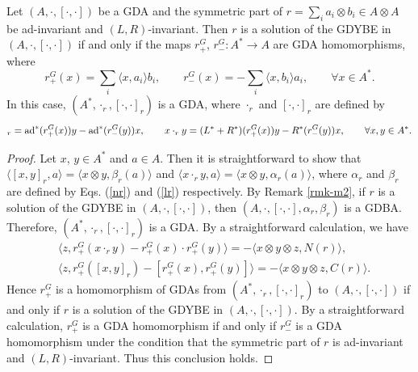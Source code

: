 \documentclass[12pt]{amsart}
\begin{document}
\begin{proposition}
    Let $(A,\cdot,[\cdot,\cdot])$ be a GDA and the symmetric part of $r=\sum_i a_i\otimes b_i \in A\otimes A$ be {\rm ad}-invariant and $(L,R)$-invariant. Then $r$ is a solution of the GDYBE in $(A,\cdot,[\cdot,\cdot])$ if and only if the maps
    $r^G_+$, $r^G_-:A^{*}\rightarrow A$ are GDA homomorphisms, where
    \begin{equation*}
        r^G_+(x)=\sum_i \langle x,a_i\rangle b_i,\qquad  r^G_-(x)=-\sum_i \langle x,b_i\rangle a_i,\qquad \forall x\in A^*.
    \end{equation*}
In this case,     $(A^{*},\cdot_r,[\cdot,\cdot]_r)$ is a GDA, where $\cdot_r$ and $[\cdot,\cdot]_r$ are defined by
    \begin{equation*}
        [x,y]_r={\rm ad}^*(r^G_+(x))y-{\rm ad}^*(r^G_-(y))x,\qquad x\cdot_r y=(L^*+R^*)(r^G_+(x))y-R^*(r^G_-(y))x,\qquad
        \forall x,y\in A^*.
    \end{equation*}
\end{proposition}
\begin{proof}
Let $x$, $y\in A^\ast$ and $a\in A$.   Then it is straightforward
to show that $\langle [x,y]_r, a\rangle =\langle x\otimes y,
\beta_r(a)\rangle$ and $\langle x\cdot_r y, a\rangle =\langle
x\otimes y, \alpha_r(a)\rangle$, where $\alpha_r$ and $\beta_r$
are defined by Eqs. (\ref{nr}) and (\ref{lr}) respectively. By
Remark \ref{rmk-m2}, if $r$ is a solution of the GDYBE in
$(A,\cdot,[\cdot,\cdot])$, then $(A, \cdot, [\cdot,\cdot],
\alpha_r, \beta_r)$ is a GDBA. Therefore,
$(A^{*},\cdot_r,[\cdot,\cdot]_r)$ is a GDA.
    By a straightforward calculation, we have
    \begin{align*}
        &\langle z,r^G_+(x\cdot_r y)-r^G_+(x)\cdot r^G_+(y)\rangle=-\langle x\otimes y\otimes z,N(r)\rangle,\\
        &\langle z,r^G_+([x,y]_r)-[r^G_+(x),r^G_+(y)]\rangle=-\langle x\otimes y\otimes
        z,C(r)\rangle.
    \end{align*}
Hence $r^G_+$ is a homomorphism of GDAs from $(A^*, \cdot_r,
[\cdot,\cdot]_r)$ to $(A, \cdot, [\cdot,\cdot])$ if and only if $r$ is a
solution of the GDYBE in $(A,\cdot,[\cdot,\cdot])$.
By   a straightforward calculation,  $r^G_+$ is a GDA homomorphism if and only if
$r^G_-$ is a GDA homomorphism under the condition that the symmetric part of $r$ is  {\rm ad}-invariant and $(L,R)$-invariant.
 Thus this conclusion
holds.
\end{proof}
\end{document}
